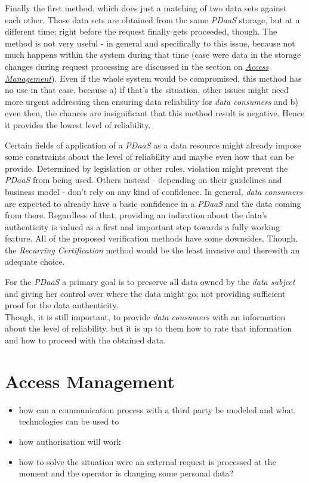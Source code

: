 \documentclass[12pt,english,a4paper,titlepage,cleardoublepage=empty,dottedtoc]{report}
\providecommand{\tightlist}{%
  \setlength{\itemsep}{0pt}\setlength{\parskip}{0pt}}
\begin{document}
Finally the first method, which does just a matching of two data sets
against each other. Those data sets are obtained from the same
\emph{PDaaS} storage, but at a different time; right before the request
finally gets proceeded, though. The method is not very useful - in
general and specifically to this issue, because not much happens within
the system during that time (case were data in the storage changes
during request processing are discussed in the section on
\emph{\protect\hyperlink{access-management}{Access Management}}). Even
if the whole system would be compromised, this method has no use in that
case, because a) if that's the situation, other issues might need more
urgent addressing then ensuring data reliability for \emph{data
consumers} and b) even then, the chances are insignificant that this
method result is negative. Hence it provides the lowest level of
reliability.

Certain fields of application of a \emph{PDaaS} as a data resource might
already impose some constraints about the level of reliability and maybe
even how that can be provide. Determined by legislation or other rules,
violation might prevent the \emph{PDaaS} from being used. Others instead
- depending on their guidelines and business model - don't rely on any
kind of confidence. In general, \emph{data consumers} are expected to
already have a basic confidence in a \emph{PDaaS} and the data coming
from there. Regardless of that, providing an indication about the data's
authenticity is valued as a first and important step towards a fully
working feature. All of the proposed verification methods have some
downsides, Though, the \emph{Recurring Certification} method would be
the least invasive and therewith an adequate choice.

For the \emph{PDaaS} a primary goal is to preserve all data owned by the
\emph{data subject} and giving her control over where the data might go;
not providing sufficient proof for the data authenticity.\\
Though, it is still important, to provide \emph{data consumers} with an
information about the level of reliability, but it is up to them how to
rate that information and how to proceed with the obtained data.

\hypertarget{access-management}{\section{Access
Management}\label{access-management}}

\begin{itemize}
\tightlist
\item
  how can a communication process with a third party be modeled and what
  technologies can be used to
\item
  how authorisation will work
\item
  how to solve the situation were an external request is processed at
  the moment and the operator is changing some personal data?
\end{itemize}
\end{document}
